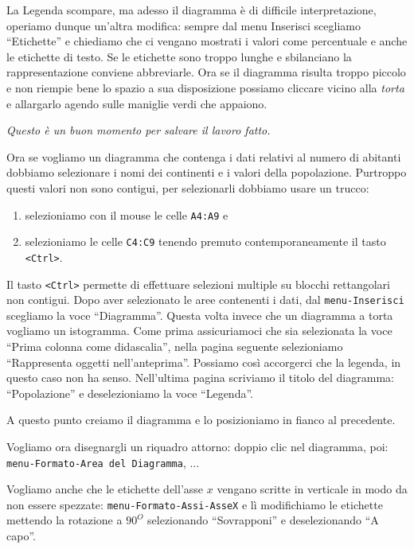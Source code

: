 La Legenda scompare, ma adesso il diagramma è di difficile interpretazione,
operiamo dunque un'altra modifica:
sempre dal menu Inserisci scegliamo ``Etichette'' e chiediamo che ci vengano
mostrati i valori come percentuale e anche le etichette di testo.
Se le etichette sono troppo lunghe e sbilanciano la rappresentazione conviene
abbreviarle.
Ora se il diagramma risulta troppo piccolo e non riempie bene lo spazio
a sua disposizione possiamo cliccare vicino alla \emph{torta} e allargarlo
agendo sulle maniglie verdi che appaiono.

\emph{Questo è un buon momento per salvare il lavoro fatto.}

Ora se vogliamo un diagramma che contenga i dati relativi al numero di
abitanti dobbiamo selezionare i nomi dei continenti e i valori della
popolazione.
Purtroppo questi valori non sono contigui, per selezionarli
dobbiamo usare un trucco:

\begin{enumerate}
\item {} 
selezioniamo con il mouse le celle \texttt{A4:A9} e
\item {} 
selezioniamo le celle \texttt{C4:C9} tenendo premuto contemporaneamente
il tasto \texttt{\textless{}Ctrl\textgreater{}}.
\end{enumerate}

Il tasto \texttt{\textless{}Ctrl\textgreater{}} permette di effettuare selezioni multiple su blocchi
rettangolari non contigui.
Dopo aver selezionato le aree contenenti i dati,
dal \texttt{menu-Inserisci} scegliamo la voce ``Diagramma''.
Questa volta invece che un diagramma a torta vogliamo un istogramma.
Come prima assicuriamoci che sia selezionata la voce
``Prima colonna come didascalia'', nella pagina seguente selezioniamo
``Rappresenta oggetti nell'anteprima''.
Possiamo così accorgerci che la legenda, in questo caso non ha senso.
Nell'ultima pagina scriviamo il titolo del diagramma: ``Popolazione'' e
deselezioniamo la voce ``Legenda''.

A questo punto creiamo il diagramma e lo posizioniamo in fianco al
precedente.

Vogliamo ora disegnargli un riquadro attorno: doppio clic nel diagramma,
poi: \texttt{menu-Formato-Area del Diagramma}, ...

Vogliamo anche che le etichette dell'asse $x$ vengano scritte in
verticale in modo da non essere spezzate: \texttt{menu-Formato-Assi-AsseX} e
lì modifichiamo le etichette mettendo la rotazione a $90^O$
selezionando ``Sovrapponi'' e deselezionando ``A capo''.

